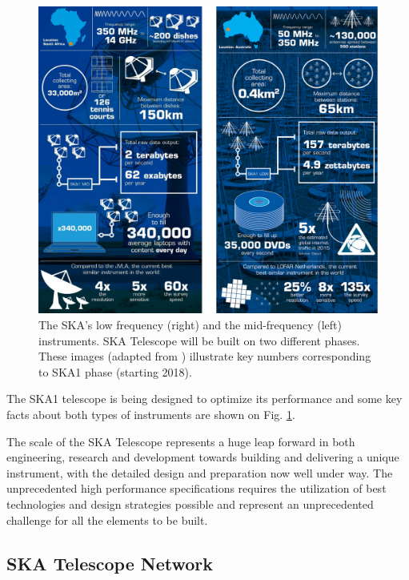\begin{figure}[h]
	\includegraphics[scale=0.25]{img/ska_instruments}
	\caption{The SKA's low frequency (right) and the mid-frequency (left) instruments.  SKA Telescope will be built on two different phases. These images (adapted from \cite{ska:multimedia_rsrcs}) illustrate key numbers corresponding to SKA1 phase (starting 2018). }
	\label{fig:ska_instruments1}
\end{figure}

The SKA1 telescope is being designed to optimize its performance and some key facts about both types of instruments are shown on Fig. \ref{fig:ska_instruments1}. 

The scale of the SKA Telescope represents a huge leap forward in both engineering, research and development towards building and delivering a unique instrument, with the detailed design and preparation now well under way. The unprecedented high performance specifications requires the utilization of best technologies and design strategies possible and represent an unprecedented challenge for all the elements to be built. 

\subsection{SKA Telescope Network}

